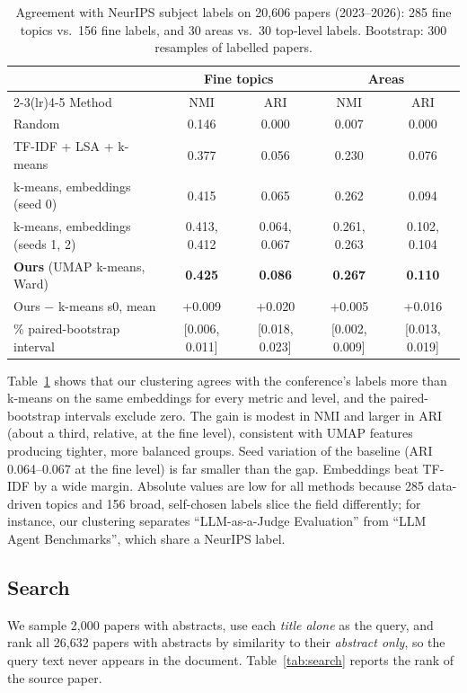 \documentclass{article}
\begin{document}
\begin{table}[t]
\centering\footnotesize\setlength{\tabcolsep}{4pt}
\caption{Agreement with NeurIPS subject labels on 20{,}606 papers (2023--2026): 285 fine topics vs.\ 156 fine labels, and 30 areas vs.\ 30 top-level labels. Bootstrap: 300 resamples of labelled papers.}
\label{tab:cluster}
\begin{tabular}{lcccc}
\toprule
 & \multicolumn{2}{c}{Fine topics} & \multicolumn{2}{c}{Areas} \\
\cmidrule(lr){2-3}\cmidrule(lr){4-5}
Method & NMI & ARI & NMI & ARI \\
\midrule
Random & 0.146 & 0.000 & 0.007 & 0.000 \\
TF-IDF + LSA + k-means & 0.377 & 0.056 & 0.230 & 0.076 \\
k-means, embeddings (seed 0) & 0.415 & 0.065 & 0.262 & 0.094 \\
k-means, embeddings (seeds 1, 2) & 0.413, 0.412 & 0.064, 0.067 & 0.261, 0.263 & 0.102, 0.104 \\
\textbf{Ours} (UMAP k-means, Ward) & \textbf{0.425} & \textbf{0.086} & \textbf{0.267} & \textbf{0.110} \\
\midrule
Ours $-$ k-means s0, mean & +0.009 & +0.020 & +0.005 & +0.016 \\
\quad 95\% paired-bootstrap interval & [0.006, 0.011] & [0.018, 0.023] & [0.002, 0.009] & [0.013, 0.019] \\
\bottomrule
\end{tabular}
\end{table}

Table~\ref{tab:cluster} shows that our clustering agrees with the conference's labels more than k-means on the same embeddings for every metric and level, and the paired-bootstrap intervals exclude zero. The gain is modest in NMI and larger in ARI (about a third, relative, at the fine level), consistent with UMAP features producing tighter, more balanced groups. Seed variation of the baseline (ARI 0.064--0.067 at the fine level) is far smaller than the gap. Embeddings beat TF-IDF by a wide margin. Absolute values are low for all methods because 285 data-driven topics and 156 broad, self-chosen labels slice the field differently; for instance, our clustering separates ``LLM-as-a-Judge Evaluation'' from ``LLM Agent Benchmarks'', which share a NeurIPS label.

\subsection{Search}
We sample 2{,}000 papers with abstracts, use each \emph{title alone} as the query, and rank all 26{,}632 papers with abstracts by similarity to their \emph{abstract only}, so the query text never appears in the document. Table~\ref{tab:search} reports the rank of the source paper.
\end{document}
